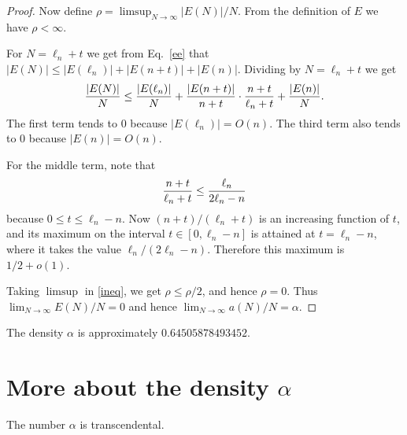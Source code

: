 \documentclass[12pt,reqno]{article}
\begin{document}
\begin{proof}
Now define $\rho = \limsup_{N \rightarrow \infty} |E(N)|/N$.
From  the definition of $E$ we have $\rho < \infty$.

For $N = \ell_n + t$ we get from Eq.~\eqref{ee} that
$|E(N)| \leq |E(\ell_n)| + |E(n+t)| + |E(n)| $.
Dividing by $N = \ell_n + t$ we get
\begin{equation}
{{|E(N)|} \over N} \leq 
{{|E(\ell_n)|} \over N} + 
{{|E(n+t)|} \over {n+t}} \cdot {{n+t} \over {\ell_n + t}} +
{{|E(n)|} \over N}. \label{ineq}
\end{equation}
The first term tends to $0$ because
$|E(\ell_n)| = O(n)$.
The third term also tends to $0$
because $|E(n)| = O(n)$.

For the middle term,  note that 
$$ {{n+t} \over {\ell_n + t}} \leq {{\ell_n} \over {2\ell_n - n}} $$
because $0 \leq t \leq \ell_n - n$.
Now $(n+t)/(\ell_n + t)$ is an increasing function of $t$,
and its maximum on the interval $t \in [0, \ell_n - n]$
is attained at $t = \ell_n -n$, where it takes the value
$\ell_n/(2\ell_n - n)$.
Therefore this maximum is $1/2 + o(1)$.  

Taking $\limsup$ in \eqref{ineq}, we get $\rho \leq \rho/2$,
and hence $\rho = 0$.   Thus
$\lim_{N \rightarrow \infty} E(N)/N = 0$
and hence
$\lim_{N \rightarrow \infty} a(N)/N = \alpha$.
\end{proof}

\begin{remark}
The density  $\alpha$ is approximately $0.64505878493452$.
\end{remark}

\section{More about the density $\alpha$}

\begin{theorem}
The number $\alpha$ is transcendental.
\end{theorem}
\end{document}
